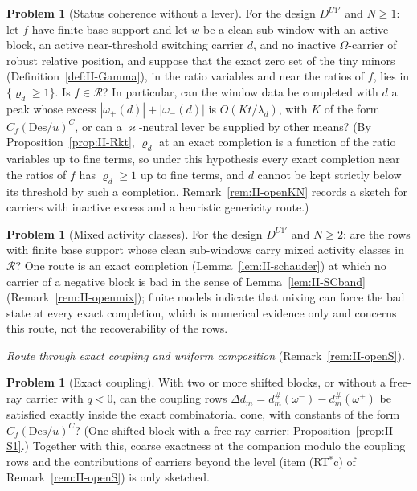 \documentclass[10pt]{amsart}
\theoremstyle{definition}
\newtheorem{problem}[theorem]{Problem}
\theoremstyle{remark}
\newcommand{\Rec}{\mathcal R}
\begin{document}
\begin{problem}[Status coherence without a lever]\label{prob:II-KN}
For the design $D^{U1'}$ and $N\ge1$: let $f$ have finite base support and
let $w$ be a clean sub-window with an active block, an active
near-threshold switching carrier $d$, and no inactive $\Omega$-carrier of
robust relative position, and suppose that the exact zero set of the tiny
minors (Definition~\ref{def:II-Gamma}), in the ratio variables and near the
ratios of $f$, lies in $\{\varrho_d\ge1\}$.  Is $f\in\Rec$?  In particular,
can the window data be completed with $d$ a peak whose excess
$|\omega_+(d)|+|\omega_-(d)|$ is $O(Kt/\lambda_d)$, with $K$ of the form
$C_f(\mathrm{Des}/u)^C$, or can a $\varkappa$-neutral lever be supplied by
other means?  (By Proposition~\ref{prop:II-Rkt}, $\varrho_d$ at an exact
completion is a function of the ratio variables up to fine terms, so under
this hypothesis every exact completion near the ratios of $f$ has
$\varrho_d\ge1$ up to fine terms, and $d$ cannot be kept strictly below its
threshold by such a completion.  Remark~\ref{rem:II-openKN} records a
sketch for carriers with inactive excess and a heuristic genericity route.)
\end{problem}

\begin{problem}[Mixed activity classes]\label{prob:II-mix}
For the design $D^{U1'}$ and $N\ge2$: are the rows with finite base
support whose clean sub-windows carry mixed activity classes in $\Rec$?  One
route is an exact completion (Lemma~\ref{lem:II-schauder}) at which no
carrier of a negative block is bad in the sense of
Lemma~\ref{lem:II-SCband} (Remark~\ref{rem:II-openmix}); finite models
indicate that mixing can force the bad state at every exact completion,
which is numerical evidence only and concerns this route, not the
recoverability of the rows.
\end{problem}

\emph{Route through exact coupling and uniform composition}
(Remark~\ref{rem:II-openS}).

\begin{problem}[Exact coupling]\label{prob:II-S1}
With two or more shifted blocks, or without a free-ray carrier with
$q<0$, can the coupling rows $\Delta d_m=d^\#_m(\omega^-)-d^\#_m(\omega^+)$ be
satisfied exactly inside the exact combinatorial cone, with constants of
the form $C_f(\mathrm{Des}/u)^C$?  (One shifted block with a free-ray carrier:
Proposition~\ref{prop:II-S1}.)  Together with this, coarse exactness at the
companion modulo the coupling rows and the contributions of carriers
beyond the level (item (RT$^*$c) of Remark~\ref{rem:II-openS}) is only
sketched.
\end{problem}
\end{document}

